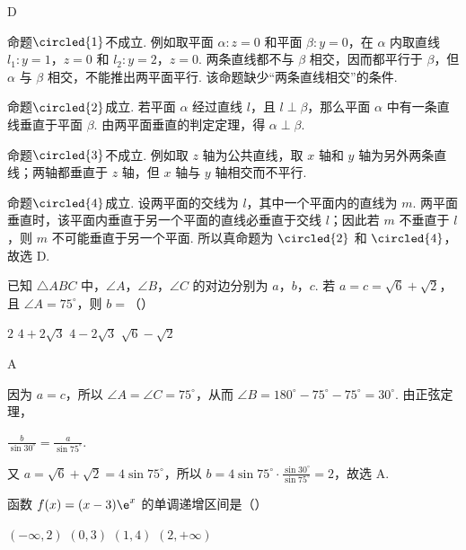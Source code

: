 \begin{answer}
D
\end{answer}

\begin{solution}
命题\(\circled{1}\)不成立. 例如取平面 \(\alpha\colon z=0\) 和平面 \(\beta\colon y=0\)，在 \(\alpha\) 内取直线 \(l_1\colon y=1\)，\(z=0\) 和 \(l_2\colon y=2\)，\(z=0\). 两条直线都不与 \(\beta\) 相交，因而都平行于 \(\beta\)，但 \(\alpha\) 与 \(\beta\) 相交，不能推出两平面平行. 该命题缺少“两条直线相交”的条件.

命题\(\circled{2}\)成立. 若平面 \(\alpha\) 经过直线 \(l\)，且 \(l\perp\beta\)，那么平面 \(\alpha\) 中有一条直线垂直于平面 \(\beta\). 由两平面垂直的判定定理，得 \(\alpha\perp\beta\).

命题\(\circled{3}\)不成立. 例如取 \(z\) 轴为公共直线，取 \(x\) 轴和 \(y\) 轴为另外两条直线；两轴都垂直于 \(z\) 轴，但 \(x\) 轴与 \(y\) 轴相交而不平行.

命题\(\circled{4}\)成立. 设两平面的交线为 \(l\)，其中一个平面内的直线为 \(m\). 两平面垂直时，该平面内垂直于另一个平面的直线必垂直于交线 \(l\)；因此若 \(m\) 不垂直于 \(l\)，则 \(m\) 不可能垂直于另一个平面. 所以真命题为 \(\circled{2}\) 和 \(\circled{4}\)，故选 D.
\end{solution}

\begin{problem}
已知 \(\triangle ABC\) 中，\(\angle A\)，\(\angle B\)，\(\angle C\) 的对边分别为 \(a\)，\(b\)，\(c\). 若 \(a = c = \sqrt{6} + \sqrt{2}\)，且 \(\angle A = 75^{\circ}\)，则 \(b =\)（\quad）

\choices
    {\(2\)}
    {\(4 + 2\sqrt{3}\)}
    {\(4 - 2\sqrt{3}\)}
    {\(\sqrt{6} -\sqrt{2}\)}
\end{problem}

\begin{answer}
A
\end{answer}

\begin{solution}
因为 \(a=c\)，所以 \(\angle A=\angle C=75^\circ\)，从而 \(\angle B=180^\circ-75^\circ-75^\circ=30^\circ\). 由正弦定理，

\(\frac{b}{\sin30^\circ}=\frac{a}{\sin75^\circ}\).

又 \(a=\sqrt6+\sqrt2=4\sin75^\circ\)，所以 \(b=4\sin75^\circ\cdot\frac{\sin30^\circ}{\sin75^\circ}=2\)，故选 A.
\end{solution}

\begin{problem}
函数 \( f(x) = (x - 3)\e^x \) 的单调递增区间是（\quad）

\choices
    {\((- \infty, 2)\)}
    {\((0,3)\)}
    {\((1,4)\)}
    {\((2, +\infty)\)}
\end{problem}

